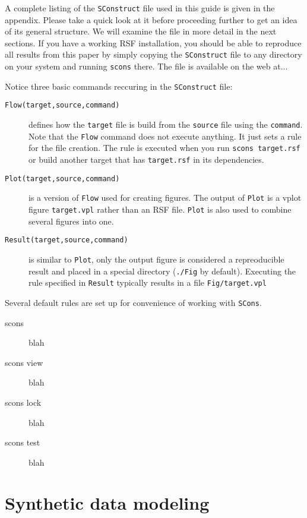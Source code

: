 A complete listing of the \texttt{SConstruct} file used in this guide
is given in the appendix. Please take a quick look at it before
proceeding further to get an idea of its general structure. We will
examine the file in more detail in the next sections. If you have a
working RSF installation, you should be able to reproduce all results
from this paper by simply copying the \texttt{SConstruct} file to any
directory on your system and running \texttt{scons} there. The file is
available on the web at...

Notice three basic commands reccuring in the \texttt{SConstruct} file:
\begin{description}
\item[\texttt{Flow(target,source,command)}] defines how the
  \texttt{target} file is build from the \texttt{source} file using the
  \texttt{command}. Note that the \texttt{Flow} command does not
  execute anything. It just sets a rule for the file creation. The
  rule is executed when you run \texttt{scons target.rsf} or build
  another target that has \texttt{target.rsf} in its dependencies.
\item[\texttt{Plot(target,source,command)}] is a version of
  \texttt{Flow} used for creating figures. The output of \texttt{Plot}
  is a vplot figure \texttt{target.vpl} rather than an RSF file.
  \texttt{Plot} is also used to combine several figures into one.
\item[\texttt{Result(target,source,command)}] is similar to
  \texttt{Plot}, only the output figure is considered a repreoducible
  result and placed in a special directory (\texttt{./Fig} by
  default). Executing the rule specified in \texttt{Result} typically
  results in a file \texttt{Fig/target.vpl}
\end{description}

Several default rules are set up for convenience of working with
\texttt{SCons}.
\begin{description}
\item[scons] blah
\item[scons view] blah
\item[scons lock] blah
\item[scons test] blah
\end{description}

\section{Synthetic data modeling}

 \clearpage
{} \clearpage
{} \clearpage
{} \clearpage

